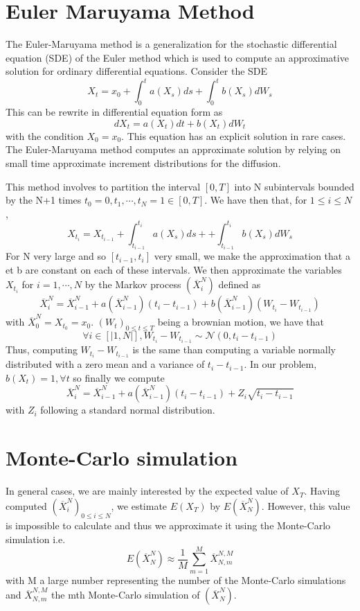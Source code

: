
\section{Euler Maruyama Method}
\label{sec:euler-maruy-meth}


The Euler-Maruyama method is a generalization for the stochastic differential equation (SDE) of the Euler method which is used to compute an approximative solution for ordinary differential equations.
\newline
Consider the SDE$$X_t=x_0+\int_{0}^{t}a(X_s)ds+\int_{0}^{t}b(X_s)dW_s$$
This can be rewrite in differential equation form as$$dX_t=a(X_t)dt+b(X_t)dW_t$$with the condition $X_0=x_0$.
\newline
This equation has an explicit solution in rare cases. The Euler-Maruyama method computes an approximate solution by relying on small time approximate increment distributions for the diffusion.

This method involves to partition the interval $\left[0,T\right]$ into N subintervals bounded by the N+1 times $t_0=0,t_1,\cdots,t_N=1\in\left[0,T\right]$. We have then that, for $1\leq i\leq N$,$$X_{t_i}=X_{t_{i-1}}+\int_{t_{i-1}}^{t_i}a(X_s)ds++\int_{t_{i-1}}^{t_i}b(X_s)dW_s$$
\newline
For N very large and so $\left[t_{i-1},t_i\right]$ very small, we make the approximation that a et b are constant on each of these intervals.
We then approximate the variables $X_{t_i}$ for $i=1,\cdots,N$ by the Markov process $(\overline{X}_i^N)$ defined as$$\overline{X}_i^N=\overline{X}_{i-1}^N+a(\overline{X}_{i-1}^N)(t_i-t_{i-1})+b(\overline{X}_{i-1}^N)(W_{t_i}-W_{t_{i-1}})$$with $\overline{X}_0^N=X_{t_0}=x_0$.
\newline
\newline
$\left(W_t\right)_{0\leq t\leq T}$ being a brownian motion, we have that$$\forall i\in\left[|1,N|\right],W_{t_i}-W_{t_{i-1}}\sim\mathcal{N}(0,t_i-t_{i-1})$$Thus, computing $W_{t_i}-W_{t_{i-1}}$ is the same than computing a variable normally distributed with a zero mean and a variance of $t_i-t_{i-1}$.
\newline
\newline
In our problem, $b(X_t)=1,\forall t$ so finally we compute $$\overline{X}_i^N=\overline{X}_{i-1}^N+a(\overline{X}_{i-1}^N)(t_i-t_{i-1})+Z_i\sqrt{t_i-t_{i-1}}$$with $Z_i$ following a standard normal distribution.
\section{Monte-Carlo simulation}
In general cases, we are mainly interested by the expected value of $X_T$. Having computed $(\overline{X}_i^N)_{0\leq i\leq N}$, we estimate $E(X_T)$ by $E\left(\overline{X}_N^N\right)$. However, this value is impossible to calculate and thus we approximate it using the Monte-Carlo simulation i.e.$$E\left(\overline{X}_N^N\right)\approx\frac{1}{M}\sum_{m=1}^{M}\overline{X}_{N,m}^{N,M}$$with M a large number representing the number of the Monte-Carlo simulations and $\overline{X}_{N,m}^{N,M}$ the mth Monte-Carlo simulation of $(\overline{X}_N^N)$.
\newline

